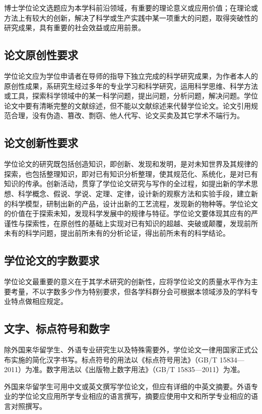 博士学位论文选题应为本学科前沿领域，有重要的理论意义或应用价值；在理论或方法上有较大的创新，解决了科学或生产实践中某一项重大的问题，取得突破性的研究成果，具有重要的社会效益或应用前景。

\subsection{论文原创性要求}

学位论文应为学位申请者在导师的指导下独立完成的科学研究成果，为作者本人的原创性成果，系研究生经过多年的专业学习和科学研究，运用科学思维、科学方法或工具，探索科学领域中的某一科学问题，提出问题，分析问题，解决问题。学位论文中要有清晰完整的文献综述，但不能以文献综述来代替学位论文。论文引用规范合理，没有伪造、篡改、剽窃、他人代写、论文买卖及其它学术不端行为。

\subsection{论文创新性要求}

学位论文的研究既包括创造知识，即创新、发现和发明，是对未知世界及其规律的探索，也包括整理知识，即对已有知识分析整理，使其规范化、系统化，是对已有知识的传承。创新活动，贯穿了学位论文研究与写作的全过程，如提出新的学术思想、科学概念、假说、学说、定理、定律，设计新的观察方法和实验手段，建立新的科学模型，研制出新的产品，设计出新的工艺流程，发现新的物种等。学位论文的价值在于探索未知，发现科学发展中的规律与特征。学位论文要体现其应有的严谨性与探索性，在原创性的基础上实现对已有知识的超越、突破或颠覆，发现前所未有的科学问题，提出前所未有的分析论证，得出前所未有的科学结论。

\subsection{学位论文的字数要求}
学位论文最重要的意义在于其学术研究的创新性，应将学位论文的质量水平作为主要考量，不以字数多少作为特别要求，但各学科群分会可根据本领域涉及的学科专业特点做相应规定。

\subsection{文字、标点符号和数字}

除外国来华留学生、外语专业研究生以及特殊需要外，学位论文一律用国家正式公布实施的简化汉字书写。标点符号的用法以《标点符号用法》（GB/T 15834—2011）为准。数字用法以《出版物上数字用法》（GB/T 15835—2011）为准。

外国来华留学生可用中文或英文撰写学位论文，但应有详细的中英文摘要。外语专业的学位论文应用所学专业相应的语言撰写，摘要应使用中文和所学专业相应的语言对照撰写。

